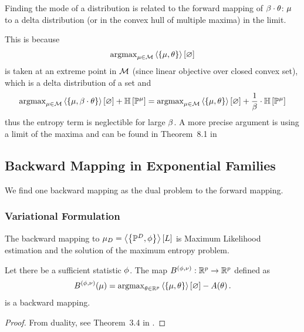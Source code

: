 Finding the mode of a distribution is related to the forward mapping of $\beta\cdot\theta$: $\mu$ to a delta distribution (or in the convex hull of multiple maxima) in the limit.

This is because 
\begin{align*}
	\mathrm{argmax}_{\mu\in\mathcal{M}}  \left\langle \left\{\mu,\theta\right\}\right\rangle \left[ \varnothing \right]
\end{align*}
is taken at an extreme point in $\mathcal{M}$ (since linear objective over closed convex set), which is a delta distribution of a set and
\begin{align*}
	\mathrm{argmax}_{\mu\in\mathcal{M}}  \left\langle \left\{\mu,\beta\cdot\theta\right\}\right\rangle \left[ \varnothing \right]+ \mathbb{H}\left[\mathbb{P}^{\mu}\right] 
	= 
	\mathrm{argmax}_{\mu\in\mathcal{M}}  \left\langle \left\{\mu,\theta\right\}\right\rangle \left[ \varnothing \right] + \frac{1}{\beta} \cdot \mathbb{H}\left[\mathbb{P}^{\mu}\right] 	
\end{align*}
thus the entropy term is neglectible for large $\beta$.
A more precise argument is using a limit of the maxima and can be found in Theorem~8.1 in \cite{wainwright_graphical_2008}





\subsection{Backward Mapping in Exponential Families}

We find one backward mapping as the dual problem to the forward mapping.

\subsubsection{Variational Formulation}

The backward mapping to $\mu_{D} = \left\langle \left\{\mathbb{P}^{D}, \phi\right\}\right\rangle \left[ L \right]$ is Maximum Likelihood estimation and the solution of the maximum entropy problem.

\begin{lemma}
	Let there be a sufficient statistic $\phi$.
	The map $B^{(\phi,\nu)}: \mathbb{R}^{p}\rightarrow \mathbb{R}^{p}$ defined as
	\begin{align*}
		B^{(\phi,\nu)}(\mu) = \mathrm{argmax}_{\theta\in\mathbb{R}^{p}}  \left\langle \left\{\mu,\theta\right\}\right\rangle \left[ \varnothing \right] - A(\theta) \, . 
	\end{align*}
	is a backward mapping.
\end{lemma}
\begin{proof}
	From duality, see Theorem~3.4 in \cite{wainwright_graphical_2008}.
\end{proof}

